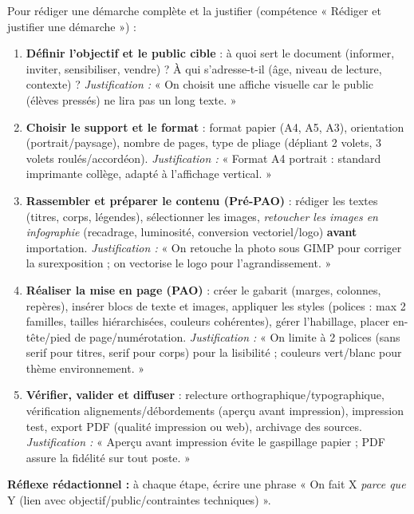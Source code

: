 \documentclass[11pt]{article}
\begin{document}
\begin{methode}
Pour rédiger une démarche complète et la justifier (compétence « Rédiger et justifier une démarche ») :
\begin{enumerate}
\item \textbf{Définir l'objectif et le public cible} : à quoi sert le document (informer, inviter, sensibiliser, vendre) ? À qui s'adresse-t-il (âge, niveau de lecture, contexte) ? \emph{Justification :} « On choisit une affiche visuelle car le public (élèves pressés) ne lira pas un long texte. »
\item \textbf{Choisir le support et le format} : format papier (A4, A5, A3), orientation (portrait/paysage), nombre de pages, type de pliage (dépliant 2 volets, 3 volets roulés/accordéon). \emph{Justification :} « Format A4 portrait : standard imprimante collège, adapté à l'affichage vertical. »
\item \textbf{Rassembler et préparer le contenu (Pré-PAO)} : rédiger les textes (titres, corps, légendes), sélectionner les images, \emph{retoucher les images en infographie} (recadrage, luminosité, conversion vectoriel/logo) \textbf{avant} importation. \emph{Justification :} « On retouche la photo sous GIMP pour corriger la surexposition ; on vectorise le logo pour l'agrandissement. »
\item \textbf{Réaliser la mise en page (PAO)} : créer le gabarit (marges, colonnes, repères), insérer blocs de texte et images, appliquer les styles (polices : max 2 familles, tailles hiérarchisées, couleurs cohérentes), gérer l'habillage, placer en-tête/pied de page/numérotation. \emph{Justification :} « On limite à 2 polices (sans serif pour titres, serif pour corps) pour la lisibilité ; couleurs vert/blanc pour thème environnement. »
\item \textbf{Vérifier, valider et diffuser} : relecture orthographique/typographique, vérification alignements/débordements (aperçu avant impression), impression test, export PDF (qualité impression ou web), archivage des sources. \emph{Justification :} « Aperçu avant impression évite le gaspillage papier ; PDF assure la fidélité sur tout poste. »
\end{enumerate}
\textbf{Réflexe rédactionnel :} à chaque étape, écrire une phrase « On fait X \emph{parce que} Y (lien avec objectif/public/contraintes techniques) ».
\end{methode}
\end{document}

